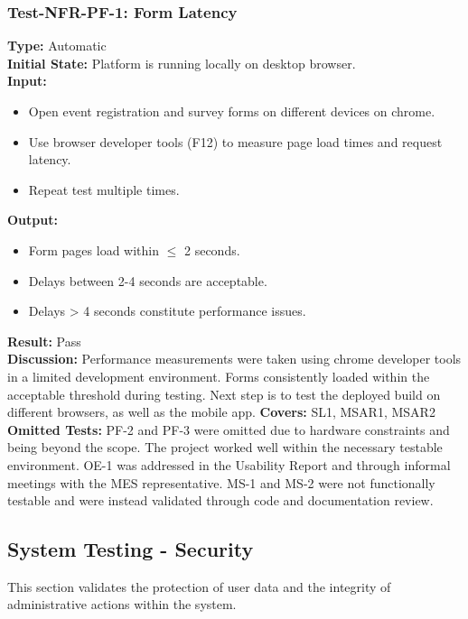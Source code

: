 \documentclass[12pt, titlepage]{article}
\begin{document}
\subsubsection{Test-NFR-PF-1: Form Latency}
\textbf{Type:} Automatic \\
\textbf{Initial State:} Platform is running locally on desktop browser. \\
\textbf{Input:}
\begin{itemize}
    \item Open event registration and survey forms on different devices on chrome.
    \item Use browser developer tools (F12) to measure page load times and request latency.
    \item Repeat test multiple times.
\end{itemize}
\textbf{Output:}
\begin{itemize}
    \item Form pages load within $\leq$ 2 seconds.
    \item Delays between 2-4 seconds are acceptable.
    \item Delays > 4 seconds constitute performance issues.
\end{itemize}
\textbf{Result:} Pass \\
\textbf{Discussion:} Performance measurements were taken using chrome developer tools in a limited development environment. Forms consistently loaded within the acceptable threshold during testing. Next step is to test the deployed build on different browsers, as well as the mobile app.
\textbf{Covers:} SL1, MSAR1, MSAR2 \\

\textbf{Omitted Tests:} PF-2 and PF-3 were omitted due to hardware constraints and being beyond the scope. The project worked well within the necessary testable environment. OE-1 was addressed in the Usability Report and through informal meetings with the MES representative. MS-1 and MS-2 were not functionally testable and were instead validated through code and documentation review.

\subsection{System Testing - Security}
This section validates the protection of user data and the integrity of administrative actions within the system.
\end{document}
